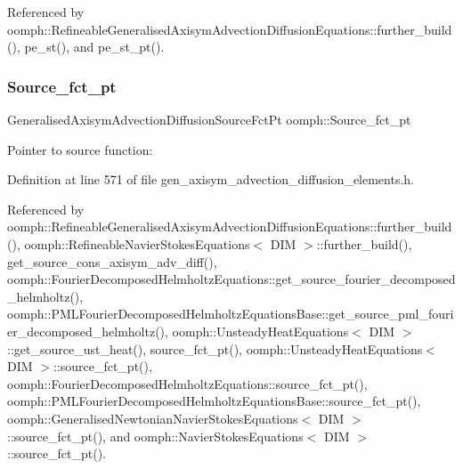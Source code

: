 Referenced by oomph\+::\+Refineable\+Generalised\+Axisym\+Advection\+Diffusion\+Equations\+::further\+\_\+build(), pe\+\_\+st(), and pe\+\_\+st\+\_\+pt().

\mbox{\label{namespaceoomph_a051e9244ca4fd64439699c8e7e7bcf09}} 
\subsubsection{\texorpdfstring{Source\+\_\+fct\+\_\+pt}{Source\_fct\_pt}}
{\footnotesize\ttfamily Generalised\+Axisym\+Advection\+Diffusion\+Source\+Fct\+Pt oomph\+::\+Source\+\_\+fct\+\_\+pt\hspace{0.3cm}{\ttfamily [protected]}}



Pointer to source function\+: 



Definition at line 571 of file gen\+\_\+axisym\+\_\+advection\+\_\+diffusion\+\_\+elements.\+h.



Referenced by oomph\+::\+Refineable\+Generalised\+Axisym\+Advection\+Diffusion\+Equations\+::further\+\_\+build(), oomph\+::\+Refineable\+Navier\+Stokes\+Equations$<$ D\+I\+M $>$\+::further\+\_\+build(), get\+\_\+source\+\_\+cons\+\_\+axisym\+\_\+adv\+\_\+diff(), oomph\+::\+Fourier\+Decomposed\+Helmholtz\+Equations\+::get\+\_\+source\+\_\+fourier\+\_\+decomposed\+\_\+helmholtz(), oomph\+::\+P\+M\+L\+Fourier\+Decomposed\+Helmholtz\+Equations\+Base\+::get\+\_\+source\+\_\+pml\+\_\+fourier\+\_\+decomposed\+\_\+helmholtz(), oomph\+::\+Unsteady\+Heat\+Equations$<$ D\+I\+M $>$\+::get\+\_\+source\+\_\+ust\+\_\+heat(), source\+\_\+fct\+\_\+pt(), oomph\+::\+Unsteady\+Heat\+Equations$<$ D\+I\+M $>$\+::source\+\_\+fct\+\_\+pt(), oomph\+::\+Fourier\+Decomposed\+Helmholtz\+Equations\+::source\+\_\+fct\+\_\+pt(), oomph\+::\+P\+M\+L\+Fourier\+Decomposed\+Helmholtz\+Equations\+Base\+::source\+\_\+fct\+\_\+pt(), oomph\+::\+Generalised\+Newtonian\+Navier\+Stokes\+Equations$<$ D\+I\+M $>$\+::source\+\_\+fct\+\_\+pt(), and oomph\+::\+Navier\+Stokes\+Equations$<$ D\+I\+M $>$\+::source\+\_\+fct\+\_\+pt().

\mbox{\label{namespaceoomph_a9065bf486c804884097785e02883f377}} 
